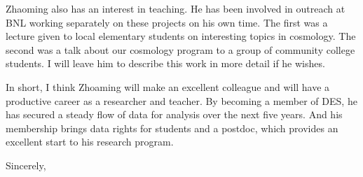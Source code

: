 \documentclass[12pt]{letter}
\begin{document}
\begin{letter}{}
Zhaoming also has an interest in teaching.  He has been involved in outreach at
BNL working separately on these projects on his own time.  The first was a
lecture given to local elementary students on interesting topics in cosmology.
The second was a talk about our cosmology program to a group of community
college students.  I will leave him to describe this work in more detail if he
wishes.

In short, I think Zhoaming will make an excellent colleague and will have a
productive career as a researcher and teacher.  By becoming a member of DES, he
has secured a steady flow of data for analysis over the next five years. And
his membership brings data rights for students and a postdoc, which provides an
excellent start to his research program.

\closing{Sincerely, }

\end{letter}
\end{document}
